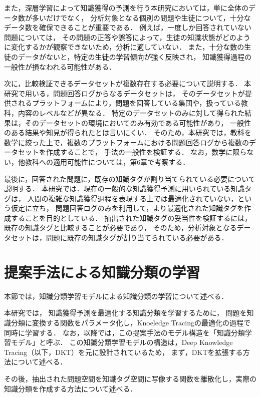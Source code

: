 また，深層学習によって知識獲得の予測を行う本研究においては，単に全体のデータ数が多いだけでなく，
分析対象となる個別の問題や生徒について，十分なデータ数を確保できることが重要である．
例えば，一度しか回答されていない問題については，
その問題の正答や誤答によって，生徒の知識状態がどのように変化するかが観察できないため，分析に適していない．
また，十分な数の生徒のデータがないと，特定の生徒の学習傾向が強く反映され，
知識獲得過程の一般性が損なわれる可能性がある．


次に，比較検証できるデータセットが複数存在する必要について説明する．
本研究で用いる，問題回答ログからなるデータセットは，
そのデータセットが提供されるプラットフォームにより，問題を回答している集団や，扱っている教科，内容のレベルなどが異なる．
特定のデータセットのみに対して得られた結果は，そのデータセットの環境においてのみ有効である可能性があり，
一般性のある結果や知見が得られたとは言いにくい．
そのため，本研究では，教科を数学に絞った上で，複数のプラットフォームにおける問題回答ログから複数のデータセットを作成することで，
手法の一般性を検証する．
なお，数学に限らない，他教科への適用可能性については，第6章で考察する．


最後に，回答された問題に，既存の知識タグが割り当てられている必要について説明する．
本研究では．現在の一般的な知識獲得予測に用いられている知識タグは，
人間の複雑な知識獲得過程を表現する上では最適化されていない，という仮定に立ち，
問題回答ログのみを利用して，より最適化された知識タグを作成することを目的としている．
抽出された知識タグの妥当性を検証するには，既存の知識タグと比較することが必要であり，
そのため，分析対象となるデータセットは，問題に既存の知識タグが割り当てられている必要がある．









\section{提案手法による知識分類の学習}
本節では，知識分類学習モデルによる知識分類の学習について述べる．

本研究では，
知識獲得予測を最適化する知識分類を学習するために，
問題を知識分類に変換する関数をパラメータ化し，Knoeledge Tracingの最適化の過程で同時に学習する．
なお，以降では，この提案手法のモデル構造を「知識分類学習モデル」と呼ぶ．
この知識分類学習モデルの構造は，Deep Knowledge Tracing（以下，DKT）を元に設計されているため，
まず，DKTを拡張する方法について述べる．

その後，抽出された問題空間を知識タグ空間に写像する関数を離散化し，実際の知識分類を作成する方法について述べる．


